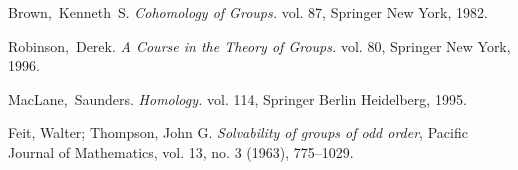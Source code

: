 
\begin{thebibliography}{99}


Brown,~Kenneth~S. \textit{Cohomology of Groups.} vol. 87, Springer New York, 1982.

Robinson,~Derek. \textit{A Course in the Theory of Groups.} vol. 80, Springer New York, 1996.

MacLane,~Saunders. \textit{Homology.} vol. 114, Springer Berlin Heidelberg, 1995.

Feit, Walter; Thompson, John G. \textit{Solvability of groups of odd order}, Pacific Journal of Mathematics, vol. 13, no. 3 (1963), 775–1029.

\end{thebibliography} 